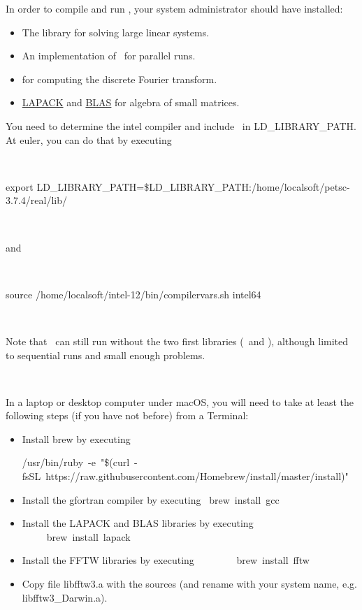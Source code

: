In order to compile and run \KNOSOS, your system administrator should have installed:

\begin{itemize}
\item The \href{http://www.mcs.anl.gov/petsc/}{\PETSC} library for solving large linear systems.
\item An implementation of \MPI~for parallel runs.
\item \href{http://www.fftw.org}{\FFTW} for computing the discrete Fourier transform.
\item \href{http://www.netlib.org/lapack/}{LAPACK} and \href{http://www.netlib.org/blas/}{BLAS} for algebra of small matrices.
\end{itemize}


You need to determine the {\ttfamily intel} compiler and include \PETSC~in {\ttfamily LD\_LIBRARY\_PATH}. At {\ttfamily euler}, you can do that by executing

\

{\ttfamily \hskip-0.6cm export LD\_LIBRARY\_PATH=\$LD\_LIBRARY\_PATH:/home/localsoft/petsc-3.7.4/real/lib/}

\

 \hskip-0.6cm and

\

{\ttfamily  \hskip-0.6cm  source /home/localsoft/intel-12/bin/compilervars.sh intel64}

\

Note that \KNOSOS~can still run without the two first libraries (\PETSC~and \MPI), although limited to sequential runs and small enough problems. 

\

In a laptop or desktop computer under {\ttfamily macOS}, you will need to take at least the following steps (if you have not before) from a Terminal:

\begin{itemize}
\item Install {\ttfamily brew} by executing 

{\hskip-2.4cm\ttfamily /usr/bin/ruby\ -e\ }"{\ttfamily \$(curl\ -fsSL\ https://raw.githubusercontent.com/Homebrew/install/master/install)}"

\item Install the {\ttfamily gfortran} compiler by executing ~{\ttfamily brew\ install\ gcc}

\item Install the {\ttfamily LAPACK} and {\ttfamily BLAS} libraries by executing ~~~~~{\ttfamily brew\ install\ lapack}

\item Install the {\ttfamily FFTW} libraries by executing ~~~~~~~~{\ttfamily brew\ install\ fftw}

\item Copy file {\ttfamily libfftw3.a} with the sources (and rename with your system name, e.g. {\ttfamily libfftw3\_Darwin.a}).


\end{itemize}

